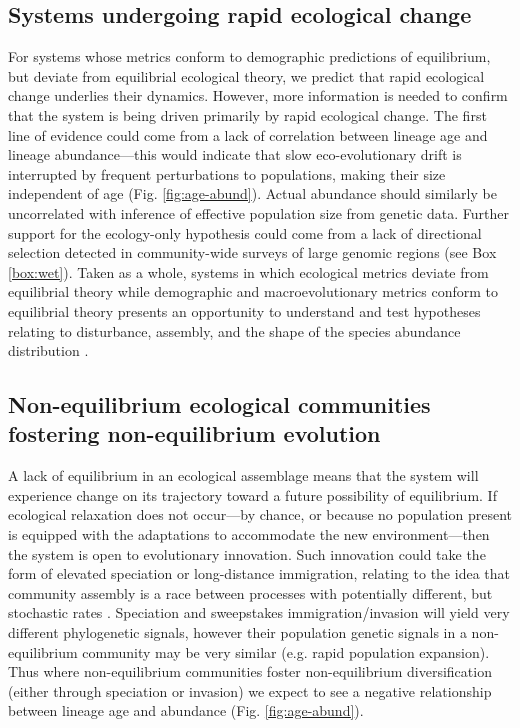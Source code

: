 \documentclass[12pt]{article}
\newcounter{Box}
\begin{document}
\subsection{Systems undergoing rapid ecological change}

For systems whose metrics conform to demographic predictions of
% 
% 
% 
% 
equilibrium, but deviate from equilibrial ecological theory, we
predict that rapid ecological change underlies their
dynamics. However, more information is needed to confirm that the
system is being driven primarily by rapid ecological change. The first
line of evidence could come from a lack of correlation between lineage
age and lineage abundance---this would indicate that slow
eco-evolutionary drift is interrupted by frequent perturbations to
populations, making their size independent of age
(Fig. \ref{fig:age-abund}). Actual abundance should similarly be
uncorrelated with inference of effective population size from genetic
data. Further support for the ecology-only hypothesis could come from
a lack of directional selection detected in community-wide surveys of
large genomic regions (see Box \ref{box:wet}). Taken as a
whole, systems in which ecological metrics deviate from equilibrial
theory while demographic and macroevolutionary metrics conform to
equilibrial theory presents an opportunity to understand and test
hypotheses relating to disturbance, assembly, and the shape of the
species abundance distribution \citep[e.g.,][]{harte2011}.

\subsection{Non-equilibrium ecological communities fostering non-equilibrium evolution}

A lack of equilibrium in an ecological assemblage means that the
system will experience change on its trajectory toward a future
possibility of equilibrium. If ecological relaxation does not
occur---by chance, or because no population present is equipped with
the adaptations to accommodate the new environment---then the system is open to
evolutionary innovation.  Such innovation could take the form of
elevated speciation or long-distance immigration, relating to the
idea that community assembly is a race between processes with
potentially different, but stochastic rates \citep{vanoverbeke2015}. Speciation and
sweepstakes immigration/invasion will yield very different phylogenetic signals,
however their population genetic signals in a non-equilibrium
community may be very similar (e.g. rapid population expansion). Thus
where non-equilibrium communities foster non-equilibrium
diversification (either through speciation or invasion) we expect to
see a negative relationship between lineage age and abundance (Fig.
\ref{fig:age-abund}).
\end{document}
